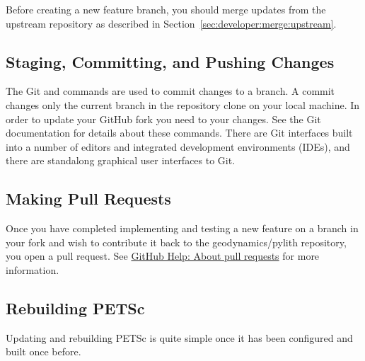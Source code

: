 Before creating a new feature branch, you should merge updates from
the upstream repository as described in Section~\vref{sec:developer:merge:upstream}.


\subsection{Staging, Committing, and Pushing Changes}
\label{sec:developer:commit}

The Git  and  commands are used
to commit changes to a branch. A commit changes only the current
branch in the repository clone on your local machine. In order to
update your GitHub fork you need to  your
changes. See the Git documentation for details about these
commands. There are Git interfaces built into a number of editors and
integrated development environments (IDEs), and there are standalong
graphical user interfaces to Git.


\subsection{Making Pull Requests}
\label{sec:developer:create:pull:request}

Once you have completed implementing and testing a new feature on a
branch in your fork and wish to contribute it back to the
geodynamics/pylith repository, you open a pull request. See
\href{https://help.github.com/articles/about-pull-requests/}{GitHub
  Help: About pull requests} for more information.


\subsection{Rebuilding PETSc}

Updating and rebuilding PETSc is quite simple once it has been configured and built once before.

